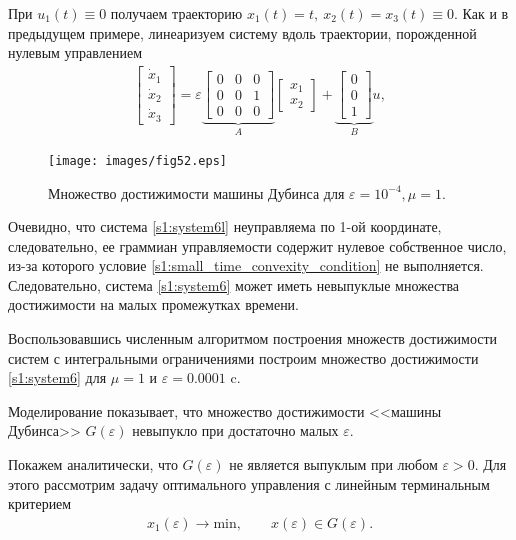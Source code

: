 \documentclass[../main.tex]{subfiles}
\begin{document}
При $ u_1(t) \equiv 0 $ получаем траекторию $ x_1(t) = t, \ x_2(t) = x_3(t) \equiv 0 $.
Как и в предыдущем примере, линеаризуем систему вдоль траектории, порожденной нулевым управлением
\begin{gather}\label{s1:system6l}
 \begin{bmatrix}
 \dot{x}_1\\
 \dot{x}_2\\
 \dot{x}_3
 \end{bmatrix}
 = 
 \varepsilon \underbrace {\begin{bmatrix}
 0&0&0\\
 0&0&1\\
 0&0&0
 \end{bmatrix}}_A
 \begin{bmatrix}
 x_1\\
 x_2
 \end{bmatrix}
 + 
 \underbrace {\begin{bmatrix}
 0\\
 0\\
 1
 \end{bmatrix}}_B u,
\end{gather}
\begin{figure}[h]
 \centering
 \texttt{[image: images/fig52.eps]}
 \caption{Множество достижимости машины Дубинса для $\varepsilon = 10^{-4}, \mu = 1$.}
\end{figure}
Очевидно, что система \eqref{s1:system6l} неуправляема по 1-ой координате, следовательно, ее граммиан управляемости содержит нулевое собственное число, из-за которого условие \eqref{s1:small_time_convexity_condition} не выполняется.
Следовательно, система \eqref{s1:system6} может иметь невыпуклые множества достижимости на малых промежутках времени.
 
Воспользовавшись численным алгоритмом построения множеств достижимости систем с интегральными ограничениями \cite{GusevZykov2018} построим множество достижимости \eqref{s1:system6} для $ \mu = 1 $ и $ \varepsilon = 0.0001 $ c. 
 
Моделирование показывает, что множество достижимости <<машины Дубинса>> $G(\varepsilon)$ невыпукло при достаточно малых $ \varepsilon $.

Покажем аналитически, что $G(\varepsilon)$ не является выпуклым при любом $\varepsilon >0$.
Для этого рассмотрим задачу оптимального управления с линейным терминальным критерием
\begin{gather}\label{s1:opt_problem}
	x_1(\varepsilon) \rightarrow \mathrm{min}, \qquad
	x(\varepsilon) \in G(\varepsilon).
\end{gather}
\end{document}
